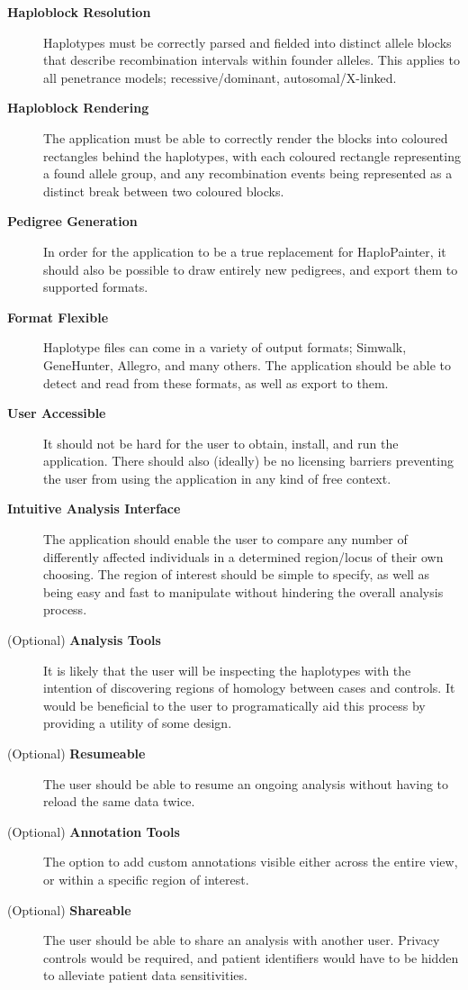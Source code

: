 \begin{description}
\item[\textbf{Haploblock Resolution}]{Haplotypes must be correctly parsed and fielded into distinct allele blocks that describe recombination intervals within founder alleles. This applies to all penetrance models; recessive/dominant, autosomal/X-linked.}
\item[\textbf{Haploblock Rendering}]{The application must be able to correctly render the blocks into coloured rectangles behind the haplotypes, with each coloured rectangle representing a found allele group, and any recombination events being represented as a distinct break between two coloured blocks.}
\item[\textbf{Pedigree Generation}]{In order for the application to be a true replacement for HaploPainter, it should also be possible to draw entirely new pedigrees, and export them to supported formats.}
\item[\textbf{Format Flexible}]{Haplotype files can come in a variety of output formats; Simwalk, GeneHunter, Allegro, and many others. The application should be able to detect and read from these formats, as well as export to them.}
\item[\textbf{User Accessible}]{It should not be hard for the user to obtain, install, and run the application. There should also (ideally) be no licensing barriers preventing the user from using the application in any kind of free context.}
\item[\textbf{Intuitive Analysis Interface}]{The application should enable the user to compare any number of differently affected individuals in a determined region/locus of their own choosing. The region of interest should be simple to specify, as well as being easy and fast to manipulate without hindering the overall analysis process.}
\item[(Optional) \textbf{Analysis Tools}]{It is likely that the user will be inspecting the haplotypes with the intention of discovering regions of homology between cases and controls. It would be beneficial to the user to programatically aid this process by providing a utility of some design.}
\item[(Optional) \textbf{Resumeable}]{The user should be able to resume an ongoing analysis without having to reload the same data twice.}
\item[(Optional) \textbf{Annotation Tools}]{The option to add custom annotations visible either across the entire view, or within a specific region of interest.}
\item[(Optional) \textbf{Shareable}]{The user should be able to share an analysis with another user. Privacy controls would be required, and patient identifiers would have to be hidden to alleviate patient data sensitivities.}
\end{description}



